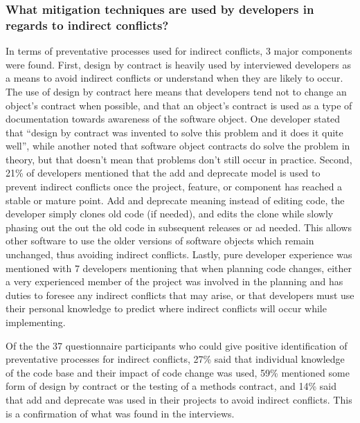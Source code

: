 \subsubsection{What mitigation techniques are used by developers in regards to indirect conflicts?}

In terms of preventative processes used for indirect conflicts, 3 major components were found.
First, design by contract is heavily used by interviewed developers as a means to avoid indirect conflicts or understand
when they are likely to occur. The use of design by contract here means that developers tend not to change an object's
contract when possible, and that an object's contract is used as a type of documentation towards awareness of the
software object. One developer stated that ``design by contract was invented to solve this problem and it does it
quite well'', while another noted that software object contracts do solve the problem in theory, but that doesn't
mean that problems don't still occur in practice.
Second, 21\% of developers mentioned that the add and deprecate
model is used to prevent indirect conflicts once
the project, feature, or component has reached a stable or mature point.
Add and deprecate meaning instead of editing code, the developer simply clones old code (if needed), and edits the clone
while slowly phasing out the out the old code in subsequent releases or ad needed. This allows other software to
use the older versions of software objects which remain unchanged, thus avoiding indirect conflicts.
Lastly, pure developer experience was mentioned with 7 developers mentioning that when planning code changes,
either a very experienced member of the project was involved in the planning and has duties to foresee any
indirect conflicts that may arise, or that developers must use their personal knowledge to predict where indirect
conflicts will occur while implementing.

Of the the 37 questionnaire participants who could give positive identification of preventative processes for indirect conflicts,
27\% said that individual knowledge of the code base and their impact of code change was used, 59\% mentioned some form of design
by contract or the testing of a methods contract, and 14\% said that add and
deprecate was used in their projects to avoid indirect conflicts. This is a confirmation of what was found in the interviews.

